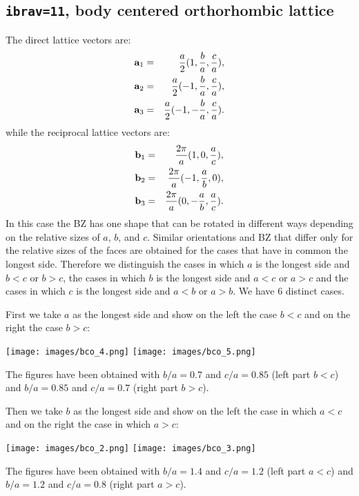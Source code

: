 \documentclass[12pt,a4paper]{article}
\begin{document}
\subsection{\texttt{ibrav=11}, body centered orthorhombic lattice}
The direct lattice vectors are:
\begin{eqnarray}
{\bf a}_1 &=& {a \over 2} (1, {b \over a}, {c \over a}), \nonumber \\
{\bf a}_2 &=& {a \over 2} (-1, {b \over a}, {c \over a}), \nonumber \\
{\bf a}_3 &=& {a \over 2} (-1, -{b \over a}, {c \over a}). \nonumber
\nonumber
\end{eqnarray}
while the reciprocal lattice vectors are:
\begin{eqnarray}
{\bf b}_1 &=& {2\pi \over a} (1, 0, {a \over c}), \nonumber \\
{\bf b}_2 &=& {2\pi \over a} (-1, {a \over b}, 0), \nonumber \\
{\bf b}_3 &=& {2\pi \over a} (0, -{a \over b}, {a \over c}). \nonumber
\nonumber
\end{eqnarray}
In this case the BZ has one shape that can be rotated in
different ways depending on the relative sizes of $a$, $b$, and $c$.
Similar orientations and BZ that differ only for the relative sizes of
the faces are obtained for the cases that have in common the longest side.
Therefore we distinguish the cases in which $a$ is the longest side 
and $b<c$ or $b>c$, the cases in which $b$ is the longest side and
$a<c$ or $a>c$ and the cases in which $c$ is the longest side and $a<b$
or $a>b$. We have $6$ distinct cases.

First we take $a$ as the longest side and show
on the left the case $b<c$ and on the right the case $b>c$:
\begin{center}
\texttt{[image: images/bco\_4.png]} \hspace{1.0cm}
\texttt{[image: images/bco\_5.png]}
\end{center}
The figures have been obtained with $b/a=0.7$ and $c/a=0.85$ (left part
$b<c$) and $b/a=0.85$ and $c/a=0.7$ (right part $b>c$).

Then we take $b$ as the longest side and show on the left the case 
in which $a<c$ and on the right the case in which $a>c$:
\begin{center}
\texttt{[image: images/bco\_2.png]}\hspace{1cm}
\texttt{[image: images/bco\_3.png]}
\end{center}
The figures have been obtained with $b/a=1.4$ and $c/a=1.2$ (left part $a<c$)
and $b/a=1.2$ and $c/a=0.8$ (right part $a>c$).
\end{document}
